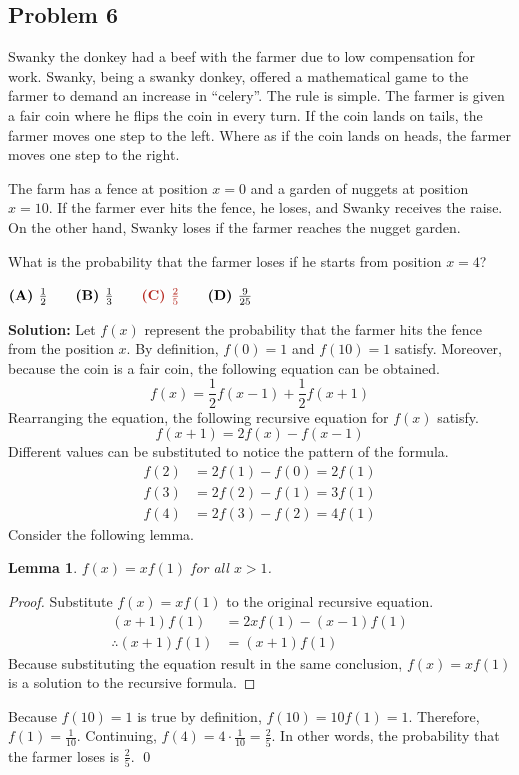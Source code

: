 \documentclass{article}
\newtheorem{lemma}[theorem]{Lemma}
\newenvironment{solution}
    {\begin{trivlist}\item[]{\bf Solution:}}
    {\qed \end{trivlist}}
\begin{document}
\subsection*{\textcolor{BrickRed}{Problem 6}}
{\color {Gray}
Swanky the donkey had a beef with the farmer due to low
compensation for work. Swanky, being a swanky donkey,
offered a mathematical game to the farmer to demand
an increase in ``celery''. The rule is simple. The
farmer is given a fair coin where he flips the coin
in every turn. If the coin lands on tails, the farmer
moves one step to the left. Where as if the coin
lands on heads, the farmer moves one step to the right.

The farm has a fence at position $x = 0$ and a
garden of nuggets at position $x = 10$. If the farmer
ever hits the fence, he loses, and Swanky receives
the raise. On the other hand, Swanky loses if the
farmer reaches the nugget garden.

What is the probability that the farmer loses if
he starts from position $x = 4$?

$
\textbf{(A) } \frac{1}{2}  \qquad
\textbf{(B) } \frac{1}{3} \qquad
\textcolor{BrickRed}{\textbf{(C) } \frac{2}{5}} \qquad
\textbf{(D) } \frac{9}{25}
$
}

\begin{solution}
Let $f(x)$ represent the probability that the farmer
hits the fence from the position $x$. By definition,
$f(0) = 1$ and $f(10) = 1$ satisfy. Moreover, because
the coin is a fair coin, the following equation can
be obtained.
\[
f(x) = \frac{1}{2} f(x - 1) + \frac{1}{2} f(x + 1)
\]
Rearranging the equation, the following recursive
equation for $f(x)$ satisfy.
\[
f(x + 1) = 2 f(x) - f(x - 1)
\]
Different values can be substituted to notice the
pattern of the formula.
\begin{align*}
    f(2) &= 2 f(1) - f(0) = 2 f(1) \\
    f(3) &= 2 f(2) - f(1) = 3 f(1) \\
    f(4) &= 2 f(3) - f(2) = 4 f(1)
\end{align*}
Consider the following lemma.
\begin{lemma}
$f(x) = x f(1)$ for all $x > 1$.
\end{lemma}
\begin{proof}
Substitute $f(x) = x f(1)$ to the original recursive
equation.
\begin{align*}
    (x + 1) f(1) &= 2x f(1) - (x - 1) f(1) \\
    \therefore (x + 1) f(1) &= (x + 1) f(1)
\end{align*}
Because substituting the equation result in the
same conclusion, $f(x) = x f(1)$ is a solution
to the recursive formula.
\end{proof}
Because $f(10) = 1$ is true by definition, $f(10)
= 10 f(1) = 1$. Therefore, $f(1) = \frac{1}{10}$.
Continuing, $f(4) = 4 \cdot \frac{1}{10} =
\frac{2}{5}$. In other words, the probability
that the farmer loses is $\frac{2}{5}$.
\end{solution}
\end{document}
